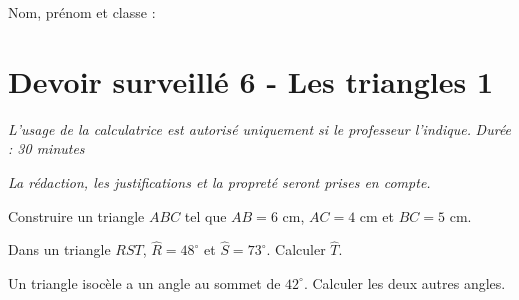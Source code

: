 \documentclass[a4paper,10pt]{report}
\begin{document}
\pagestyle{empty}
\noindent Nom, prénom et classe : \dotfill

\section*{Devoir surveillé 6 - Les triangles 1}

\noindent \textit{L'usage de la calculatrice est autorisé uniquement si le professeur l'indique.} \hfill \textit{Durée : 30 minutes}

\medskip
\noindent \textit{La rédaction, les justifications et la propreté seront prises en compte.}


\begin{ex}[Construction]
Construire un triangle $ABC$ tel que $AB=6$ cm, $AC=4$ cm et $BC=5$ cm.
\medskip\noindent\grandscarreaux{\linewidth}{6cm}
\end{ex}
\begin{ex}[Angles]
Dans un triangle $RST$, $\widehat{R}=48^\circ$ et $\widehat{S}=73^\circ$. Calculer $\widehat{T}$.
\medskip\noindent\grandscarreaux{\linewidth}{3cm}
\end{ex}
\begin{ex}[Raisonner]
Un triangle isocèle a un angle au sommet de $42^\circ$. Calculer les deux autres angles.
\medskip\noindent\grandscarreaux{\linewidth}{3cm}
\end{ex}
\end{document}
